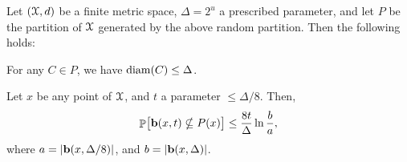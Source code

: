 \begin{lemma}
    Let $(\FMS,d)$ be a finite metric space, $\Delta = 2^u$ a prescribed
    parameter, and let $P$ be the partition of $\FMS$ generated by the
    above random partition. Then the following holds:
    \begin{compactenumi}
        \item For any $C \in P$, we have $\mathrm{diam}(C) \leq \Delta$.
    
        \item Let $x$ be any point of $\FMS$, and $t$ a parameter $\leq
        \Delta/8$.  Then,
        \begin{equation*}
            \Prob{\bigl. \Ball(x,t) \nsubseteq P(x)}%
            \leq%
            \frac{8t}{\Delta} \ln \frac{b}{a},
        \end{equation*}
        where $a = |\mathbf{b}(x, \Delta/8)|$, and
        $b = |\mathbf{b}(x, \Delta)|$.
    \end{compactenumi}
\end{lemma}
